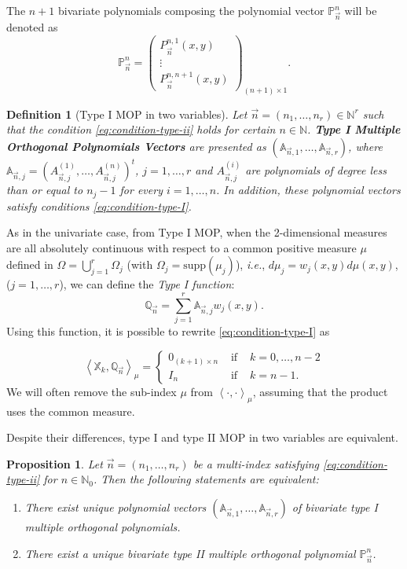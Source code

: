 \documentclass[12pt,a4]{report}
\theoremstyle{plain}
\newtheorem{proposition}[theorem]{Proposition}
\newtheorem{definition}[theorem]{Definition}
\newcommand{\N}[0]{\mathbb{N}}
\newcommand{\supp}[0]{\mathrm{supp}}
\newcommand{\prodesc}[2]{\left\langle #1 , #2 \right\rangle}
\begin{document}
The $n+1$ bivariate polynomials composing the polynomial vector $\mathbb P_{\vec n}^n$ will be denoted as
$$
\mathbb P_{\vec n}^n = 
\begin{pmatrix}
    P_{\vec n}^{n,1}(x,y) \\ \vdots \\ P_{\vec n}^{n,n+1}(x,y)
\end{pmatrix}_{(n+1)\times 1}.
$$

\begin{definition}[Type I MOP in two variables]
    Let $\vec n = (n_1, \dots, n_r)\in \N^r$ such that the condition \eqref{eq:condition-type-ii} holds for certain $n\in\N$. \textbf{Type I Multiple Orthogonal Polynomials Vectors} are presented as $(\mathbb A_{\vec n,1}, \dots, \mathbb A_{\vec n,r})$, where 
    $\mathbb A_{\vec n,j}=(A_{\vec n,j}^{(1)}, \dots, A_{\vec n,j}^{(n)})^t$, $j=1,\dots,r$ and $A_{\vec n,j}^{(i)}$ are polynomials of degree less than or equal to $n_j-1$ for every $i=1,\dots,n$. In addition, these polynomial vectors satisfy conditions \eqref{eq:condition-type-I}.     
\end{definition}

As in the univariate case, from Type I MOP, when the 2-dimensional measures are all absolutely continuous with respect to a common positive measure $\mu$ defined in $\Omega = \displaystyle\bigcup_{j=1}^r \Omega_j$ (with $\Omega_j=\supp(\mu_j)$), \textit{i.e.}, $d\mu_j = w_j(x,y)d\mu(x,y)$, ($j=1,\dots,r$), we can define the \textit{Type I function}:
\begin{equation}
    \label{eq:type-I-function-2-vars}
    \mathbb Q_{\vec n} = \sum_{j=1}^r \mathbb A_{\vec n,j}w_j(x,y).
\end{equation}
Using this function, it is possible to rewrite \eqref{eq:condition-type-I} as

\begin{equation}
    \prodesc{\mathbb X_k}{\mathbb Q_{\vec n}}_\mu = \left\{\begin{array}{ccl}
        0_{(k+1)\times n} &   \text{ if } & k=0,\dots,n-2 \\
        I_n & \text{ if } & k=n-1.
    \end{array}\right.     
\end{equation}
We will often remove the sub-index $\mu$ from $\prodesc{\cdot}{\cdot}_\mu$, assuming that the product uses the common measure.

Despite their differences, type I and type II MOP in two variables are equivalent.
\begin{proposition}
  \label{prop:existence}
  Let $\vec n = (n_1,\dots,n_r)$ be a multi-index satisfying \eqref{eq:condition-type-ii} for $n\in\N_0$. Then the following statements are equivalent:
  \begin{enumerate}
      \item There exist unique polynomial vectors $(\mathbb A_{\vec n,1}, \dots, \mathbb A_{\vec n,r})$ of bivariate type I multiple orthogonal polynomials.
      \item There exist a unique bivariate type II multiple orthogonal polynomial $\mathbb P_{\vec n}^n$.
  \end{enumerate}
\end{proposition}
\end{document}
